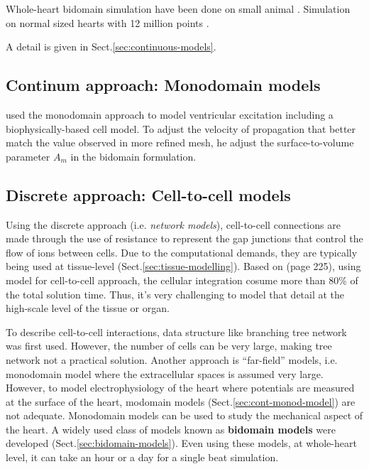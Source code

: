 Whole-heart bidomain simulation have been done on small animal
\citep{aguel2003}. Simulation on normal sized hearts with 12 million points
\citep{gulrajani2001}.


A detail is given in Sect.\ref{sec:continuous-models}.

\subsection{Continum approach: Monodomain models}

\citep{Huiskamp1998} used the monodomain approach to model ventricular
excitation including a biophysically-based cell model. To adjust the velocity of
propagation that better match the value observed in more refined mesh, he adjust
the surface-to-volume parameter $A_m$ in the bidomain formulation.


\citep{trudel2004}
 


\subsection{Discrete approach: Cell-to-cell models}

Using the discrete approach (i.e. {\it network models}), cell-to-cell
connections are made through the use of resistance to represent the gap
junctions that control the flow of ions between cells. Due to the computational
demands, they are typically being used at tissue-level
(Sect.\ref{sec:tissue-modelling}). Based on \citep{Pullan2005} (page 225), using
\citep{noble1998} model for cell-to-cell approach, the cellular integration
cosume more than 80\% of the total solution time. Thus, it's very challenging to
model that detail at the high-scale level of the tissue or organ.


To describe cell-to-cell interactions, data structure like branching tree
network was first used. However, the number of cells can be very large, making
tree network not a practical solution. Another approach is ``far-field'' models,
i.e. monodomain model where the extracellular spaces is assumed very large.
However, to model electrophysiology of the heart where potentials are measured
at the surface of the heart, modomain models (Sect.\ref{sec:cont-monod-model})
are not adequate. Monodomain models can be used to study the mechanical aspect
of the heart. A widely used class of models known as {\bf bidomain models} were
developed \citep{tung1978} (Sect.\ref{sec:bidomain-models}). Even using these
models, at whole-heart level, it can take an hour or a day for a single beat
simulation.


